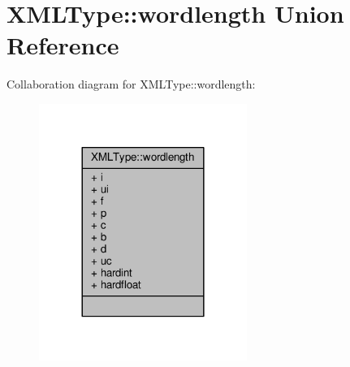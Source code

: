 \hypertarget{unionXMLType_1_1wordlength}{}\section{X\+M\+L\+Type\+:\+:wordlength Union Reference}
\label{unionXMLType_1_1wordlength}


Collaboration diagram for X\+M\+L\+Type\+:\+:wordlength\+:
\nopagebreak
\begin{figure}[H]
\begin{center}
\leavevmode
\includegraphics[width=192pt]{d7/db1/unionXMLType_1_1wordlength__coll__graph}
\end{center}
\end{figure}
